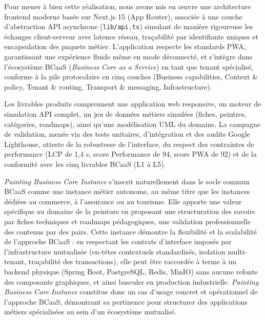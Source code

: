 \documentclass[12pt,a4paper]{report}
\begin{document}
Pour mener à bien cette réalisation, nous avons mis en œuvre une architecture frontend moderne basée sur Next.js 15 (App Router), associée à une couche d'abstraction API asynchrone (\texttt{lib/api.ts}) simulant de manière rigoureuse les échanges client-serveur avec latence réseau, traçabilité par identifiants uniques et encapsulation des paquets métier. L'application respecte les standards PWA, garantissant une expérience fluide même en mode déconnecté, et s'intègre dans l'écosystème BCaaS (\textit{Business Core as a Service}) en tant que tenant spécialisé, conforme à la pile protocolaire en cinq couches (Business capabilities, Context \& policy, Tenant \& routing, Transport \& messaging, Infrastructure).

Les livrables produits comprennent une application web responsive, un moteur de simulation API complet, un jeu de données métiers simulées (fiches, peintres, catégories, roadmaps), ainsi qu'une modélisation UML du domaine. La campagne de validation, menée via des tests unitaires, d'intégration et des audits Google Lighthouse, atteste de la robustesse de l'interface, du respect des contraintes de performance (LCP de 1,4 s, score Performance de 94, score PWA de 92) et de la conformité avec les cinq livrables BCaaS (L1 à L5).



\textit{Painting Business Core Instance} s'inscrit naturellement dans le socle commun BCaaS comme une instance métier autonome, au même titre que les instances dédiées au commerce, à l'assurance ou au tourisme. Elle apporte une valeur spécifique au domaine de la peinture en proposant une structuration des savoirs par fiches techniques et roadmaps pédagogiques, une validation professionnelle des contenus par des pairs. Cette instance démontre la flexibilité et la scalabilité de l'approche BCaaS : en respectant les contrats d'interface imposés par l'infrastructure mutualisée (en-têtes contextuels standardisés, isolation multi-tenant, traçabilité des transactions), elle peut être raccordée à terme à un backend physique (Spring Boot, PostgreSQL, Redis, MinIO) sans aucune refonte des composants graphiques, et ainsi basculer en production industrielle. \textit{Painting Business Core Instance} constitue donc un cas d'usage concret et opérationnel de l'approche BCaaS, démontrant sa pertinence pour structurer des applications métiers spécialisées au sein d'un écosystème mutualisé.

\end{document}
